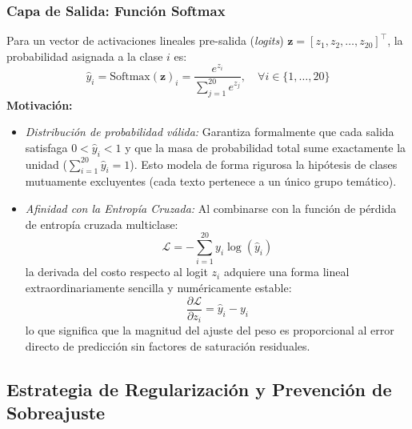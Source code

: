 \documentclass[12pt, a4paper]{article}
\begin{document}
\subsubsection{Capa de Salida: Función \textbf{Softmax}}
Para un vector de activaciones lineales pre-salida (\textit{logits}) $\mathbf{z} = [z_1, z_2, \dots, z_{20}]^\top$, la probabilidad asignada a la clase $i$ es:
\begin{equation}
    \hat{y}_i = \text{Softmax}(\mathbf{z})_i = \frac{e^{z_i}}{\sum_{j=1}^{20} e^{z_j}}, \quad \forall i \in \{1, \dots, 20\}
\end{equation}
\textbf{Motivación:}
\begin{itemize}
    \item \textit{Distribución de probabilidad válida:} Garantiza formalmente que cada salida satisfaga $0 < \hat{y}_i < 1$ y que la masa de probabilidad total sume exactamente la unidad ($\sum_{i=1}^{20} \hat{y}_i = 1$). Esto modela de forma rigurosa la hipótesis de clases mutuamente excluyentes (cada texto pertenece a un único grupo temático).
    \item \textit{Afinidad con la Entropía Cruzada:} Al combinarse con la función de pérdida de entropía cruzada multiclase:
    \begin{equation}
        \mathcal{L} = -\sum_{i=1}^{20} y_i \log(\hat{y}_i)
    \end{equation}
    la derivada del costo respecto al logit $z_i$ adquiere una forma lineal extraordinariamente sencilla y numéricamente estable:
    \begin{equation}
        \frac{\partial \mathcal{L}}{\partial z_i} = \hat{y}_i - y_i
    \end{equation}
    lo que significa que la magnitud del ajuste del peso es proporcional al error directo de predicción sin factores de saturación residuales.
\end{itemize}

\subsection{Estrategia de Regularización y Prevención de Sobreajuste}
\end{document}
